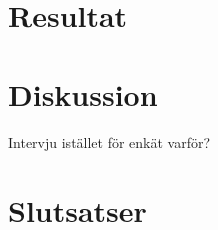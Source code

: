 \section{Resultat}
\section{Diskussion}
Intervju istället för enkät varför?
\section{Slutsatser}



